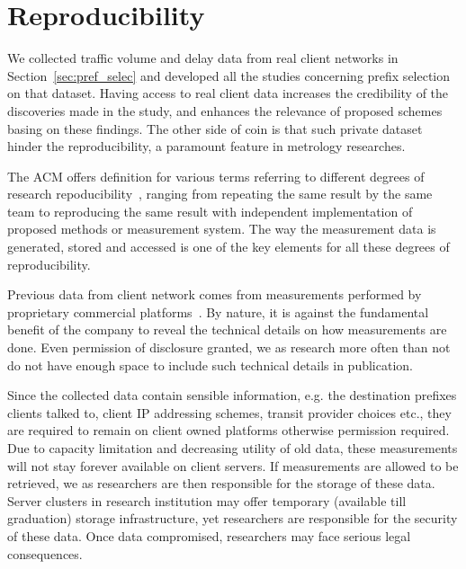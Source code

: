 \section{Reproducibility}
We collected traffic volume and delay data from real client networks in Section~\ref{sec:pref_selec} and developed all the studies concerning prefix selection on that dataset.
Having access to real client data increases the credibility of the discoveries made in the study, and enhances the relevance of proposed schemes basing on these findings.
The other side of coin is that such private dataset hinder the reproducibility, a paramount feature in metrology researches.

The \acf{ACM} offers definition for various terms referring to different degrees of research repoducibility~\cite{acm}, ranging from repeating the same result by the same team to reproducing the same result with independent implementation of proposed methods or measurement system.
The way the measurement data is generated, stored and accessed is one of the key elements for all these degrees of reproducibility.

Previous data from client network comes from measurements performed by proprietary commercial platforms~\cite{b6}.
By nature, it is against the fundamental benefit of the company to reveal the technical details on how measurements are done. Even permission of disclosure granted, we as research more often than not do not have enough space to include such technical details in publication.

Since the collected data contain sensible information, e.g. the destination prefixes clients talked to, client IP addressing schemes, transit provider choices etc., they are required to remain on client owned platforms otherwise permission required. Due to capacity limitation and decreasing utility of old data, these measurements will not stay forever available on client servers. If measurements are allowed to be retrieved, we as researchers are then responsible for the storage of these data. Server clusters in research institution may offer temporary (available till graduation) storage infrastructure, yet researchers are responsible for the security of these data. Once data compromised, researchers may face serious legal consequences.

